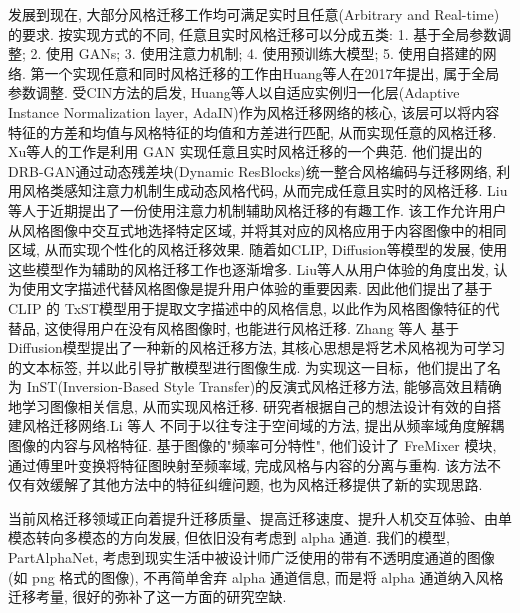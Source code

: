 发展到现在, 大部分风格迁移工作均可满足实时且任意(Arbitrary and Real-time)的要求. 按实现方式的不同, 任意且实时风格迁移可以分成五类: 1. 基于全局参数调整; 2. 使用 GANs; 3. 使用注意力机制; 4. 使用预训练大模型; 5. 使用自搭建的网络. 第一个实现任意和同时风格迁移的工作由Huang等人在2017年提出\cite{huang2017arbitrary}, 属于全局参数调整. 受CIN方法\cite{dumoulin2016learned}的启发, Huang等人以自适应实例归一化层(Adaptive Instance Normalization layer, AdaIN)作为风格迁移网络的核心, 该层可以将内容特征的方差和均值与风格特征的均值和方差进行匹配, 从而实现任意的风格迁移. 
Xu等人的工作\cite{xu2021drb}是利用 GAN 实现任意且实时风格迁移的一个典范. 他们提出的DRB-GAN通过动态残差块(Dynamic ResBlocks)统一整合风格编码与迁移网络, 利用风格类感知注意力机制生成动态风格代码, 从而完成任意且实时的风格迁移.
Liu等人于近期提出了一份使用注意力机制辅助风格迁移的有趣工作\cite{liu2304any}. 该工作允许用户从风格图像中交互式地选择特定区域, 并将其对应的风格应用于内容图像中的相同区域, 从而实现个性化的风格迁移效果.
随着如CLIP, Diffusion等模型的发展, 使用这些模型作为辅助的风格迁移工作也逐渐增多. Liu等人\cite{liu2023name}从用户体验的角度出发, 认为使用文字描述代替风格图像是提升用户体验的重要因素. 因此他们提出了基于 CLIP 的 TxST模型用于提取文字描述中的风格信息, 以此作为风格图像特征的代替品, 这使得用户在没有风格图像时, 也能进行风格迁移. Zhang 等人\cite{zhang2023inversion} 基于Diffusion模型提出了一种新的风格迁移方法, 其核心思想是将艺术风格视为可学习的文本标签, 并以此引导扩散模型进行图像生成. 为实现这一目标，他们提出了名为 InST(Inversion-Based Style Transfer)的反演式风格迁移方法, 能够高效且精确地学习图像相关信息, 从而实现风格迁移.
研究者根据自己的想法设计有效的自搭建风格迁移网络.Li 等人\cite{li2023frequency} 不同于以往专注于空间域的方法, 提出从频率域角度解耦图像的内容与风格特征. 基于图像的"频率可分特性", 他们设计了 FreMixer 模块, 通过傅里叶变换将特征图映射至频率域, 完成风格与内容的分离与重构. 该方法不仅有效缓解了其他方法中的特征纠缠问题, 也为风格迁移提供了新的实现思路.

当前风格迁移领域正向着提升迁移质量、提高迁移速度、提升人机交互体验、由单模态转向多模态的方向发展, 但依旧没有考虑到 alpha 通道. 我们的模型, PartAlphaNet, 考虑到现实生活中被设计师广泛使用的带有不透明度通道的图像(如 png 格式的图像), 不再简单舍弃 alpha 通道信息, 而是将 alpha 通道纳入风格迁移考量, 很好的弥补了这一方面的研究空缺.